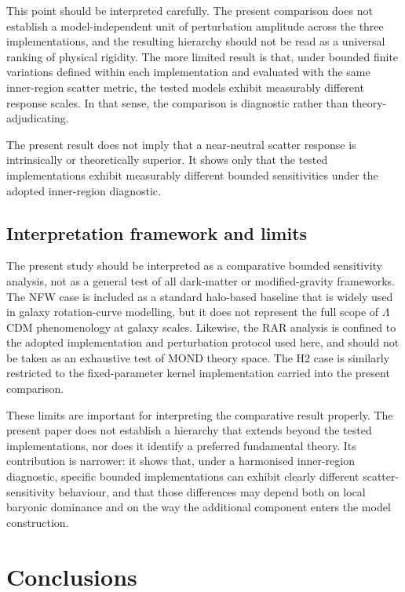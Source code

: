 \documentclass[fleqn,usenatbib]{mnras}
\begin{document}
This point should be interpreted carefully. The present comparison does
not establish a model-independent unit of perturbation amplitude across
the three implementations, and the resulting hierarchy should not be
read as a universal ranking of physical rigidity. The more limited
result is that, under bounded finite variations defined within each
implementation and evaluated with the same inner-region scatter metric,
the tested models exhibit measurably different response scales. In that
sense, the comparison is diagnostic rather than theory-adjudicating.

The present result does not imply that a near-neutral scatter response
is intrinsically or theoretically superior. It shows only that the tested
implementations exhibit measurably different bounded sensitivities
under the adopted inner-region diagnostic.

\subsection{Interpretation framework and limits}
\label{subsec:interpretation_limits}

The present study should be interpreted as a comparative bounded
sensitivity analysis, not as a general test of all dark-matter or
modified-gravity frameworks. The NFW case is included as a standard
halo-based baseline that is widely used in galaxy rotation-curve
modelling, but it does not represent the full scope of $\Lambda$CDM
phenomenology at galaxy scales. Likewise, the RAR analysis is confined
to the adopted implementation and perturbation protocol used here, and
should not be taken as an exhaustive test of MOND theory space. The H2 case is similarly restricted to the fixed-parameter
kernel implementation carried into the present comparison.

These limits are important for interpreting the comparative result
properly. The present paper does not establish a hierarchy that extends
beyond the tested implementations, nor does it identify a preferred
fundamental theory. Its contribution is narrower: it shows that, under
a harmonised inner-region diagnostic, specific bounded implementations
can exhibit clearly different scatter-sensitivity behaviour, and that
those differences may depend both on local baryonic dominance and on
the way the additional component enters the model construction.

\section{Conclusions}
\label{sec:conclusions}
\end{document}

